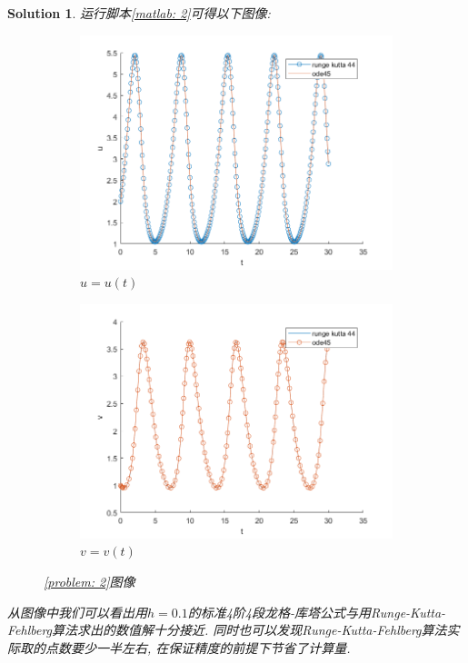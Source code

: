 \documentclass[a4paper, 12pt]{ctexart}
\theoremstyle{plain}
\theoremstyle{plain}
\theoremstyle{plain}
\theoremstyle{nonumberplain}
\newtheorem{solution}{Solution}
\begin{document}
    \begin{solution}
        运行脚本\ref{matlab: 2}可得以下图像:
        \begin{figure}[H]
            \centering
            \begin{subfigure}[b]{0.45\textwidth}
                \centering
                \includegraphics[width=\textwidth]{wc21.png}
                \caption{$u=u(t)$}
            \end{subfigure}
            \hfill
            \begin{subfigure}[b]{0.45\textwidth}
                \centering
                \includegraphics[width=\textwidth]{wc22.png}
                \caption{$v=v(t)$}
            \end{subfigure}
            \caption{\ref{problem: 2}图像}
       \end{figure}
       从图像中我们可以看出用$h=0.1$的标准4阶4段龙格-库塔公式与用Runge-Kutta-Fehlberg算法求出的数值解十分接近. 同时也可以发现Runge-Kutta-Fehlberg算法实际取的点数要少一半左右, 在保证精度的前提下节省了计算量.
    \end{solution}
\end{document}
